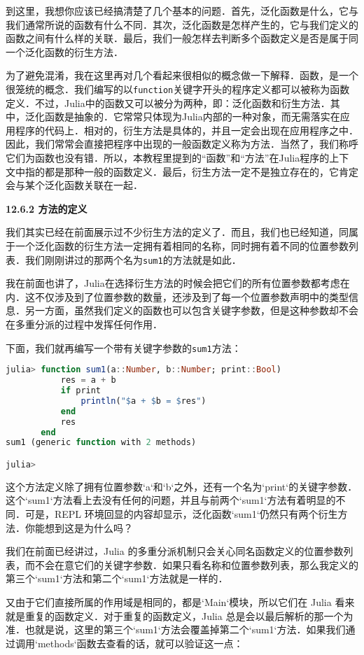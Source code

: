 到这里，我想你应该已经搞清楚了几个基本的问题．首先，泛化函数是什么，它与我们通常所说的函数有什么不同．其次，泛化函数是怎样产生的，它与我们定义的函数之间有什么样的关联．最后，我们一般怎样去判断多个函数定义是否是属于同一个泛化函数的衍生方法．

为了避免混淆，我在这里再对几个看起来很相似的概念做一下解释．函数，是一个很笼统的概念．我们编写的以\verb|function|关键字开头的程序定义都可以被称为函数定义．不过，Julia中的函数又可以被分为两种，即：泛化函数和衍生方法．其中，泛化函数是抽象的．它常常只体现为Julia内部的一种对象，而无需落实在应用程序的代码上．相对的，衍生方法是具体的，并且一定会出现在应用程序之中．因此，我们常常会直接把程序中出现的一般函数定义称为方法．当然了，我们称呼它们为函数也没有错．所以，本教程里提到的“函数”和“方法”在Julia程序的上下文中指的都是那种一般的函数定义．最后，衍生方法一定不是独立存在的，它肯定会与某个泛化函数关联在一起．

\textbf{12.6.2 方法的定义}

我们其实已经在前面展示过不少衍生方法的定义了．而且，我们也已经知道，同属于一个泛化函数的衍生方法一定拥有着相同的名称，同时拥有着不同的位置参数列表．我们刚刚讲过的那两个名为\verb|sum1|的方法就是如此．

我在前面也讲了，Julia在选择衍生方法的时候会把它们的所有位置参数都考虑在内．这不仅涉及到了位置参数的数量，还涉及到了每一个位置参数声明中的类型信息．另一方面，虽然我们定义的函数也可以包含关键字参数，但是这种参数却不会在多重分派的过程中发挥任何作用．

下面，我们就再编写一个带有关键字参数的\verb|sum1|方法：

\begin{lstlisting}[language=julia]
julia> function sum1(a::Number, b::Number; print::Bool)
           res = a + b
           if print
               println("$a + $b = $res")
           end
           res
       end
sum1 (generic function with 2 methods)

julia>
\end{lstlisting}

这个方法定义除了拥有位置参数`a`和`b`之外，还有一个名为`print`的关键字参数．这个`sum1`方法看上去没有任何的问题，并且与前两个`sum1`方法有着明显的不同．可是，REPL 环境回显的内容却显示，泛化函数`sum1`仍然只有两个衍生方法．你能想到这是为什么吗？

我们在前面已经讲过，Julia 的多重分派机制只会关心同名函数定义的位置参数列表，而不会在意它们的关键字参数．如果只看名称和位置参数列表，那么我定义的第三个`sum1`方法和第二个`sum1`方法就是一样的．

又由于它们直接所属的作用域是相同的，都是`Main`模块，所以它们在 Julia 看来就是重复的函数定义．对于重复的函数定义，Julia 总是会以最后解析的那一个为准．也就是说，这里的第三个`sum1`方法会覆盖掉第二个`sum1`方法．如果我们通过调用`methods`函数去查看的话，就可以验证这一点：

